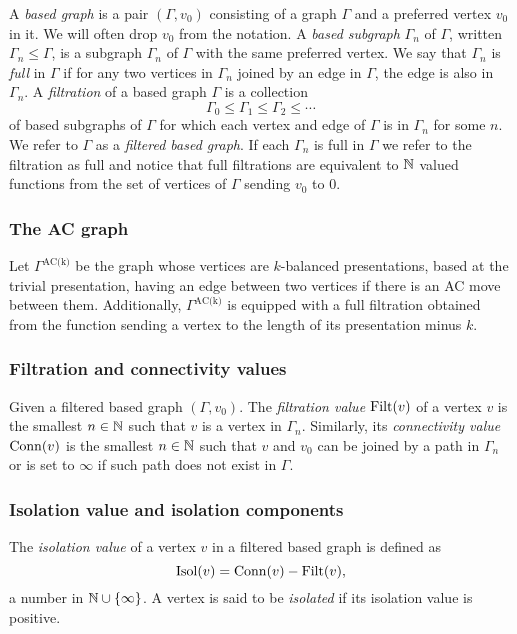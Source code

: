 A \textit{based graph} is a pair $(\Gamma, v_0)$ consisting of a graph $\Gamma$ and a preferred vertex $v_0$ in it.
We will often drop $v_0$ from the notation.
A \textit{based subgraph} $\Gamma_n$ of $\Gamma$, written $\Gamma_n \leq \Gamma$, is a subgraph $\Gamma_n$ of $\Gamma$ with the same preferred vertex.
We say that $\Gamma_n$ is \textit{full} in $\Gamma$ if for any two vertices in $\Gamma_n$ joined by an edge in $\Gamma$, the edge is also in $\Gamma_n$.
A \textit{filtration} of a based graph $\Gamma$ is a collection
\[
\Gamma_0 \leq \Gamma_1 \leq \Gamma_2 \leq \dotsb
\]
of based subgraphs of $\Gamma$ for which each vertex and edge of $\Gamma$ is in $\Gamma_n$ for some $n$.
We refer to $\Gamma$ as a \textit{filtered based graph}.
If each $\Gamma_n$ is full in $\Gamma$ we refer to the filtration as full and notice that full filtrations are equivalent to $\mathbb{N}$ valued functions from the set of vertices of $\Gamma$ sending $v_0$ to $0$.

\subsubsection{The AC graph}

Let $\Gamma^{\text{AC(k)}}$ be the graph whose vertices are $k$-balanced presentations, based at the trivial presentation, having an edge between two vertices if there is an AC move between them.
Additionally, $\Gamma^{\text{AC(k)}}$ is equipped with a full filtration obtained from the function sending a vertex to the length of its presentation minus $k$.

\subsubsection{Filtration and connectivity values}

Given a filtered based graph $(\Gamma, v_0)$.
The \textit{filtration value} $\operatorname{Filt}(v)$ of a vertex $v$ is the smallest $n \in \mathbb{N}$ such that $v$ is a vertex in $\Gamma_n$.
Similarly, its \textit{connectivity value} $\operatorname{Conn}(v)$ is the smallest $n \in \mathbb{N}$ such that $v$ and $v_0$ can be joined by a path in $\Gamma_n$ or is set to $\infty$ if such path does not exist in $\Gamma$.

\subsubsection{Isolation value and isolation components}

The \textit{isolation value} of a vertex $v$ in a filtered based graph is defined as
\[
\operatorname{Isol}(v) = \operatorname{Conn}(v) - \operatorname{Filt}(v),
\]
a number in $\mathbb{N} \cup \{\infty\}$.
A vertex is said to be \textit{isolated} if its isolation value is positive.

